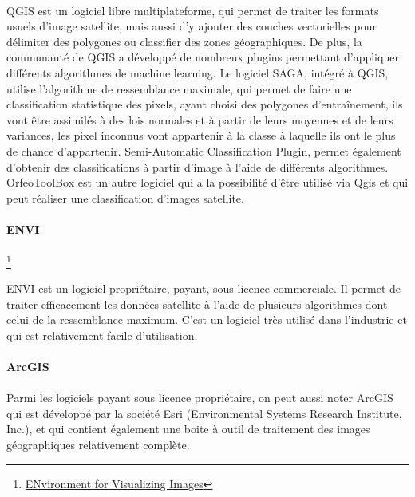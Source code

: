 \documentclass[a4paper,10pt]{report}
\begin{document}
\paragraph{}
QGIS est un logiciel libre multiplateforme, qui permet de traiter les formats usuels d'image satellite, mais aussi d'y ajouter des couches vectorielles pour délimiter des polygones ou classifier des zones géographiques.
De plus, la communauté de QGIS a développé de nombreux plugins permettant d'appliquer différents algorithmes de machine learning.\newline
Le logiciel SAGA, intégré à QGIS, utilise l'algorithme de ressemblance maximale, qui permet de faire une classification statistique des pixels, ayant choisi des polygones d’entraînement, ils vont être assimilés à des lois normales et à partir de leurs moyennes et de leurs variances, les pixel inconnus vont appartenir à la classe à laquelle ils ont le plus de chance d'appartenir.
Semi-Automatic Classification Plugin, permet également d'obtenir des classifications à partir d'image à l'aide de différents algorithmes.
OrfeoToolBox est un autre logiciel qui a la possibilité d'être utilisé via Qgis et qui peut réaliser une classification d'images satellite.

\paragraph{ENVI}\footnote{\href{http://www.exelisvis.fr/ProduitsetServices/LesproduitsENVI/ENVI.aspx}{ENvironment for Visualizing Images}}
\paragraph{}
ENVI est un logiciel propriétaire, payant, sous licence commerciale. Il permet de traiter efficacement les données satellite à l'aide de plusieurs algorithmes dont celui de la ressemblance maximum. C'est un logiciel très utilisé dans l'industrie et qui est relativement facile d'utilisation.
\paragraph{ArcGIS}
\paragraph{}
Parmi les logiciels payant sous licence propriétaire, on peut aussi noter ArcGIS qui est développé par la société Esri (Environmental Systems Research Institute, Inc.), et qui contient également une boite à outil de traitement des images géographiques relativement complète.


\end{document}

